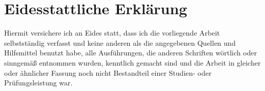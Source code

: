 \pagebreak
\thispagestyle{empty}
\section*{Eidesstattliche Erklärung}

Hiermit versichere ich an Eides statt, dass ich die vorliegende Arbeit selbstständig verfasst und keine anderen als die angegebenen Quellen und Hilfsmittel benutzt habe, alle Ausführungen, die anderen Schriften wörtlich oder sinngemäß entnommen wurden, kenntlich gemacht sind und die Arbeit in gleicher oder ähnlicher Fassung noch nicht Bestandteil einer Studien- oder Prüfungsleistung war.\\[5cm]

